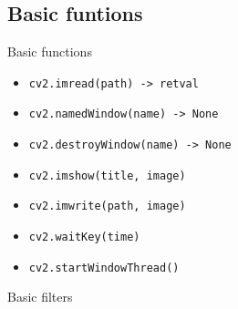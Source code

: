 \documentclass{beamer}
\begin{document}
\subsection{Basic funtions}
\begin{frame}{Basic functions}
\transdissolve
  \pause
  \begin{itemize}[<+-| alert@+ >]
    \item \texttt{cv2.imread(path) -> retval}
    \item \texttt{cv2.namedWindow(name) -> None}
    \item \texttt{cv2.destroyWindow(name) -> None}
    \item \texttt{cv2.imshow(title, image)}
    \item \texttt{cv2.imwrite(path, image)}
    \item \texttt{cv2.waitKey(time)}
    \item \texttt{cv2.startWindowThread()}
  \end{itemize}
\end{frame}

{
\begin{frame}{Basic filters}
 
\end{frame}
}
\end{document}
